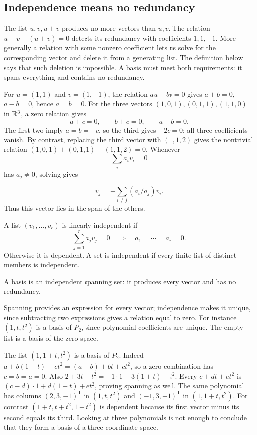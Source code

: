 \subsection{Independence means no redundancy}
The list $u,v,u+v$ produces no more vectors than $u,v$.
The relation $u+v-(u+v)=0$ detects its redundancy with coefficients
$1,1,-1$. More generally a relation with some nonzero coefficient lets us
solve for the corresponding vector and delete it from a generating list.
The definition below says that such deletion is impossible. A basis must
meet both requirements: it spans everything and contains no redundancy.
\begin{example}
For $u=(1,1)$ and $v=(1,-1)$, the relation $au+bv=0$ gives
$a+b=0$, $a-b=0$, hence $a=b=0$. For the three vectors
$(1,0,1),(0,1,1),(1,1,0)$ in $\mathbb{R}^3$, a zero relation gives
\[
a+c=0,\qquad b+c=0,\qquad a+b=0.
\]
The first two imply $a=b=-c$, so the third gives $-2c=0$; all three
coefficients vanish. By contrast, replacing the third vector with $(1,1,2)$
gives the nontrivial relation $(1,0,1)+(0,1,1)-(1,1,2)=0$.
Whenever
\[
\sum_i a_iv_i=0
\]
 has $a_j\ne0$, solving gives

\[
v_j=-\sum_{i\ne j}(a_i/a_j)v_i.
\]
 Thus this vector lies in the span of the others.
\end{example}
\begin{definition}
A list $(v_1,\ldots,v_r)$ is linearly independent if
\[
\sum_{j=1}^r a_jv_j=0\quad\Longrightarrow\quad a_1=\cdots=a_r=0.
\]
Otherwise it is dependent. A set is independent if every finite list of
distinct members is independent.
\end{definition}
\begin{definition}[Basis]
A basis is an independent spanning set: it produces every vector and has
no redundancy.
\end{definition}
Spanning provides an expression for every vector; independence makes it
unique, since subtracting two expressions gives a relation equal to zero.
For instance $(1,t,t^2)$ is a basis of $P_2$, since polynomial coefficients
are unique. The empty list is a basis of the zero space.

\begin{example}
The list $(1,1+t,t^2)$ is a basis of $P_2$. Indeed
$a+b(1+t)+ct^2=(a+b)+bt+ct^2$, so a zero combination has
$c=b=a=0$. Also
$2+3t-t^2=-1\cdot1+3(1+t)-t^2$. Every $c+dt+et^2$ is
$(c-d)\cdot1+d(1+t)+et^2$, proving spanning as well.
The same polynomial has columns $(2,3,-1)^{\mathsf T}$ in
$(1,t,t^2)$ and $(-1,3,-1)^{\mathsf T}$ in $(1,1+t,t^2)$.
For contrast $(1+t,t+t^2,1-t^2)$ is dependent because its first vector
minus its second equals its third. Looking at three polynomials is not
enough to conclude that they form a basis of a three-coordinate space.
\end{example}

